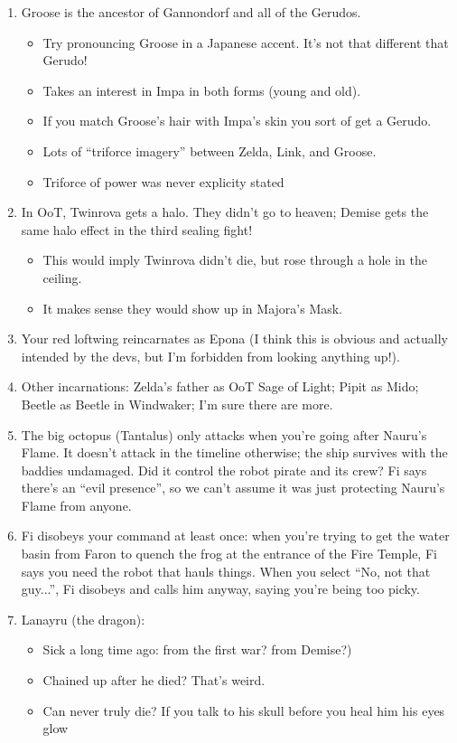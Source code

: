 
\newpage
{}

\begin{enumerate}
	\item{Groose is the ancestor of Gannondorf and all of the Gerudos.
		\begin{itemize}
			\item{Try pronouncing Groose in a Japanese accent. It's not that different that Gerudo!}
			\item{Takes an interest in Impa in both forms (young and old).}
			\item{If you match Groose's hair with Impa's skin you sort of get a Gerudo.}
			\item{Lots of ``triforce imagery'' between Zelda, Link, and Groose.} 
			\item{Triforce of power was never explicity stated }
		\end{itemize}
	}
	\item{In OoT, Twinrova gets a halo. They didn't go to heaven; Demise gets the same halo effect in the third sealing fight!
		\begin{itemize}
			\item{This would imply Twinrova didn't die, but rose through a hole in the ceiling.}
			\item{It makes sense they would show up in Majora's Mask.}
		\end{itemize}
	}
	\item{Your red loftwing reincarnates as Epona (I think this is obvious and actually intended by the devs, but I'm forbidden from looking anything up!).}
	\item{Other incarnations: Zelda's father as OoT Sage of Light; Pipit as Mido; Beetle as Beetle in Windwaker; I'm sure there are more.}
	\item{The big octopus (Tantalus) only attacks when you're going after Nauru's Flame. It doesn't attack in the timeline otherwise; the ship survives with the baddies undamaged. Did it control the robot pirate and its crew? Fi says there's an ``evil presence'', so we can't assume it was just protecting Nauru's Flame from anyone.}
	\item{Fi disobeys your command at least once: when you're trying to get the water basin from Faron to quench the frog at the entrance of the Fire Temple, Fi says you need the robot that hauls things. When you select ``No, not that guy...'', Fi disobeys and calls him anyway, saying you're being too picky.}
	\item{Lanayru (the dragon):
		\begin{itemize}
			\item{Sick a long time ago: from the first war? from Demise?)}
			\item{Chained up after he died? That's weird.}
			\item{Can never truly die? If you talk to his skull before you heal him his eyes glow}
		\end{itemize}
		}
\end{enumerate}

